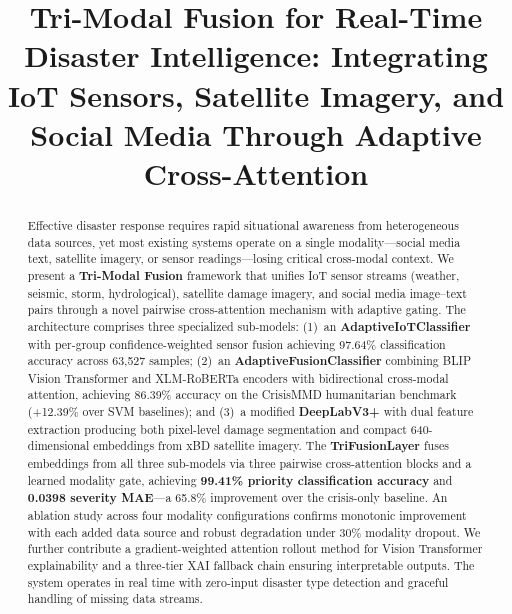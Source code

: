 \documentclass[journal]{IEEEtran}
\begin{document}
\title{Tri-Modal Fusion for Real-Time Disaster Intelligence: Integrating IoT Sensors, Satellite Imagery, and Social Media Through Adaptive Cross-Attention}

\author{
}

\maketitle

\begin{abstract}
Effective disaster response requires rapid situational awareness from heterogeneous data sources, yet most existing systems operate on a single modality---social media text, satellite imagery, or sensor readings---losing critical cross-modal context. We present a \textbf{Tri-Modal Fusion} framework that unifies IoT sensor streams (weather, seismic, storm, hydrological), satellite damage imagery, and social media image--text pairs through a novel pairwise cross-attention mechanism with adaptive gating. The architecture comprises three specialized sub-models: (1)~an \textbf{AdaptiveIoTClassifier} with per-group confidence-weighted sensor fusion achieving 97.64\% classification accuracy across 63,527 samples; (2)~an \textbf{AdaptiveFusionClassifier} combining BLIP Vision Transformer and XLM-RoBERTa encoders with bidirectional cross-modal attention, achieving 86.39\% accuracy on the CrisisMMD humanitarian benchmark (+12.39\% over SVM baselines); and (3)~a modified \textbf{DeepLabV3+} with dual feature extraction producing both pixel-level damage segmentation and compact 640-dimensional embeddings from xBD satellite imagery. The \textbf{TriFusionLayer} fuses embeddings from all three sub-models via three pairwise cross-attention blocks and a learned modality gate, achieving \textbf{99.41\% priority classification accuracy} and \textbf{0.0398 severity MAE}---a 65.8\% improvement over the crisis-only baseline. An ablation study across four modality configurations confirms monotonic improvement with each added data source and robust degradation under 30\% modality dropout. We further contribute a gradient-weighted attention rollout method for Vision Transformer explainability and a three-tier XAI fallback chain ensuring interpretable outputs. The system operates in real time with zero-input disaster type detection and graceful handling of missing data streams.
\end{abstract}
\end{document}
